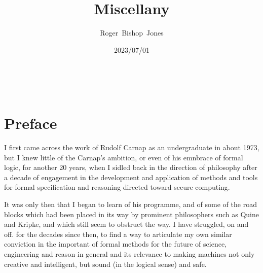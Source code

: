 \documentclass[10pt,titlepage]{book}
\title{Miscellany}
\author{Roger~Bishop~Jones}
\date{\small 2023/07/01}
\newcommand{\ignore}[1]{}
\begin{document}
\frontmatter

%
                               
\begin{titlepage}
\maketitle





\end{titlepage}

\ \

\ignore{
\begin{centering}
{}
\end{centering}
}%

\setcounter{tocdepth}{2}
{\parskip-0pt\tableofcontents}


\mainmatter

\section*{Preface}

I first came across the work of Rudolf Carnap as an undergraduate in about 1973, but I knew little of the Carnap's ambition, or even of his emnbrace of formal logic, for another 20 years, when I sidled back in the direction of philosophy after a decade of engagement in the development and application  of methods and tools for formal specification and reasoning directed toward secure computing.

It was only then that I began to learn of his programme, and of some of the road blocks which had been placed in its way by prominent philosophers such as Quine and Kripke, and which still seem to obstruct the way.
I have struggled, on and off. for the decades since then, to find a way to articulate my own similar conviction in the important of formal methods for the future of science, engineering and reason in general and its relevance to making machines not only creative and intelligent, but sound (in the logical sense) and safe.
\end{document}
